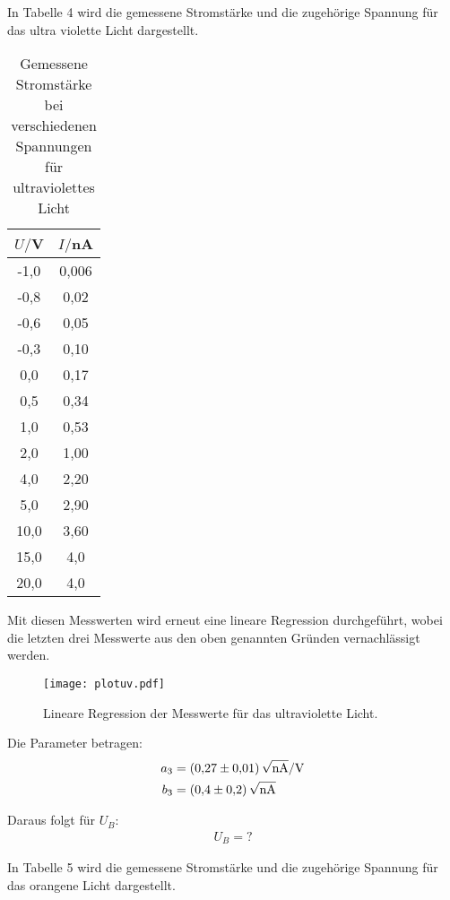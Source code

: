 In Tabelle 4 wird die gemessene Stromstärke und die zugehörige Spannung für das ultra violette Licht dargestellt.

\begin{table}[H]
  \centering
  \caption{Gemessene Stromstärke bei verschiedenen Spannungen für ultraviolettes Licht}
  \label{tab:Spannungsamplitude}
  \begin{tabular}{c c}
    \toprule
    $U/$V & $I/$nA \\
    \midrule
    -1,0 &	0,006 \\
    -0,8 &	0,02 \\
    -0,6 &	0,05 \\
    -0,3 &	0,10 \\
    0,0 &	0,17 \\
    0,5   &  0,34 \\
    1,0	 &  0,53 \\
    2,0	 &  1,00 \\
    4,0	 &  2,20 \\
    5,0	 &  2,90 \\
    10,0 &  3,60 \\
    15,0 &  4,0 \\
    20,0 & 4,0 \\
    \bottomrule
  \end{tabular}
\end{table}

Mit diesen Messwerten wird erneut eine lineare Regression durchgeführt, wobei die letzten drei Messwerte
aus den oben genannten Gründen vernachlässigt werden.

\begin{figure}[H]
  \centering
  \texttt{[image: plotuv.pdf]}
  \caption{Lineare Regression der Messwerte für das ultraviolette Licht.}
  \label{fig:plotuv}
\end{figure}

Die Parameter betragen:
\begin{align*}
  a_3 &= \SI{0.27(1)}{\sqrt{\nano\ampere}\per\volt} \\
  b_3 &= \SI{0.4(2)}{\sqrt{\nano\ampere}}
\end{align*}

Daraus folgt für $U_B$:
\begin{align*}
  U_B = ?
\end{align*}

In Tabelle 5 wird die gemessene Stromstärke und die zugehörige Spannung für das orangene Licht dargestellt.

